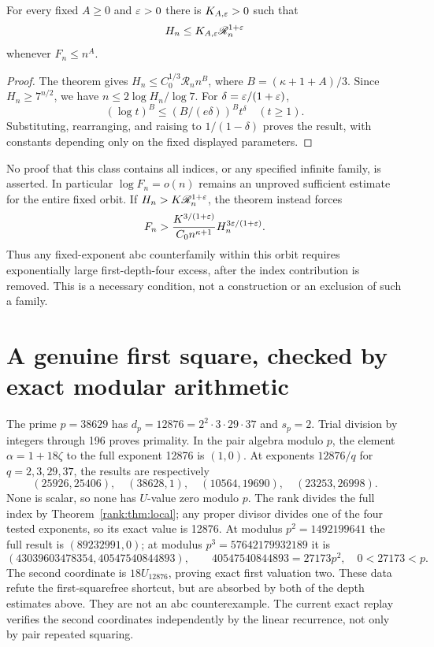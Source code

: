 \begin{corollary}\label{rank:cor:class}
For every fixed $A\ge0$ and $\varepsilon>0$ there is $K_{A,\varepsilon}>0$ such that
\[
 H_n\le K_{A,\varepsilon}\mathscr R_n^{1+\varepsilon}
\]
whenever $F_n\le n^A$.
\end{corollary}
\begin{proof}
The theorem gives $H_n\le C_0^{1/3}\mathscr R_n n^B$, where $B=(\kappa+1+A)/3$. Since $H_n\ge7^{n/2}$, we have $n\le2\log H_n/\log7$. For $\delta=\varepsilon/(1+\varepsilon)$,
\[
 (\log t)^B\le(B/(e\delta))^B t^\delta\quad(t\ge1).
\]
Substituting, rearranging, and raising to $1/(1-\delta)$ proves the result, with constants depending only on the fixed displayed parameters.
\end{proof}
No proof that this class contains all indices, or any specified infinite family, is asserted. In particular $\log F_n=o(n)$ remains an unproved sufficient estimate for the entire fixed orbit. If $H_n>K\mathscr R_n^{1+\varepsilon}$, the theorem instead forces
\[
 F_n>\frac{K^{3/(1+\varepsilon)}}{C_0n^{\kappa+1}}
             H_n^{3\varepsilon/(1+\varepsilon)}.
\]
Thus any fixed-exponent abc counterfamily within this orbit requires exponentially large first-depth-four excess, after the index contribution is removed. This is a necessary condition, not a construction or an exclusion of such a family.

\section{A genuine first square, checked by exact modular arithmetic}
The prime $p=38629$ has $d_p=12876=2^2\cdot3\cdot29\cdot37$ and $s_p=2$. Trial division by integers through 196 proves primality. In the pair algebra modulo $p$, the element $\alpha=1+18\zeta$ to the full exponent 12876 is $(1,0)$. At exponents $12876/q$ for $q=2,3,29,37$, the results are respectively
\[
 (25926,25406),\quad(38628,1),\quad
 (10564,19690),\quad(23253,26998).
\]
None is scalar, so none has $U$-value zero modulo $p$. The rank divides the full index by Theorem~\ref{rank:thm:local}; any proper divisor divides one of the four tested exponents, so its exact value is 12876.
At modulus $p^2=1492199641$ the full result is $(89232991,0)$; at modulus $p^3=57642179932189$ it is
\[
 (43039603478354,40547540844893),\qquad
 40547540844893=27173p^2,\quad0<27173<p.
\]
The second coordinate is $18U_{12876}$, proving exact first valuation two. These data refute the first-squarefree shortcut, but are absorbed by both of the depth estimates above. They are not an abc counterexample. The current exact replay verifies the second coordinates independently by the linear recurrence, not only by pair repeated squaring.

